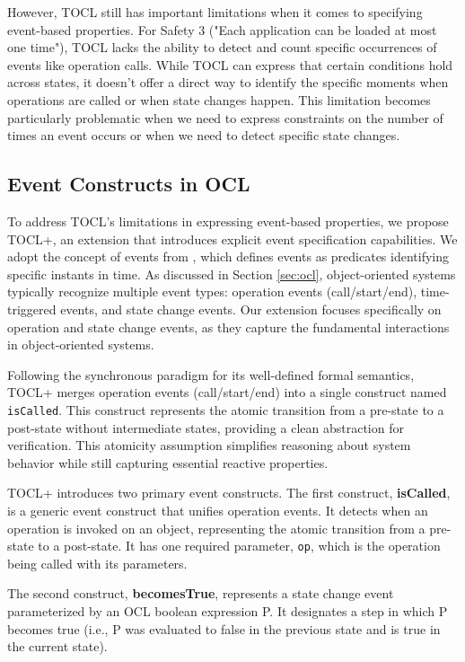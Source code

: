 However, TOCL still has important limitations when it comes to specifying event-based 
properties. For Safety 3 ("Each application can be loaded at most one time"), TOCL 
lacks the ability to detect and count specific occurrences of events like operation 
calls. While TOCL can express that certain conditions hold across states, it doesn't 
offer a direct way to identify the specific moments when operations are called or 
when state changes happen. This limitation becomes particularly problematic when we 
need to express constraints on the number of times an event occurs or when we need 
to detect specific state changes.

\subsection{Event Constructs in OCL}

\hspace{1cm} To address TOCL's limitations in expressing event-based properties, we 
propose TOCL+, an extension that introduces explicit event specification capabilities. 
We adopt the concept of events from \cite{TemporalAndEventOCL}, which defines events 
as predicates identifying specific instants in time. As discussed in Section 
\ref{sec:ocl}, object-oriented systems typically recognize multiple event types: 
operation events (call/start/end), time-triggered events, and state change events. 
Our extension focuses specifically on operation and state change events, as they 
capture the fundamental interactions in object-oriented systems.

Following the synchronous paradigm for its well-defined formal semantics, TOCL+ 
merges operation events (call/start/end) into a single construct named 
\texttt{isCalled}. This construct represents the atomic transition from a pre-state 
to a post-state without intermediate states, providing a clean abstraction for 
verification. This atomicity assumption simplifies reasoning about system behavior 
while still capturing essential reactive properties.

TOCL+ introduces two primary event constructs. The first construct, \textbf{isCalled}, 
is a generic event construct that unifies operation events. It detects when an 
operation is invoked on an object, representing the atomic transition from a 
pre-state to a post-state. It has one required parameter, \texttt{op}, which is the 
operation being called with its parameters.

The second construct, \textbf{becomesTrue}, represents a state change event 
parameterized by an OCL boolean expression P. It designates a step in which P becomes 
true (i.e., P was evaluated to false in the previous state and is true in the current 
state).

